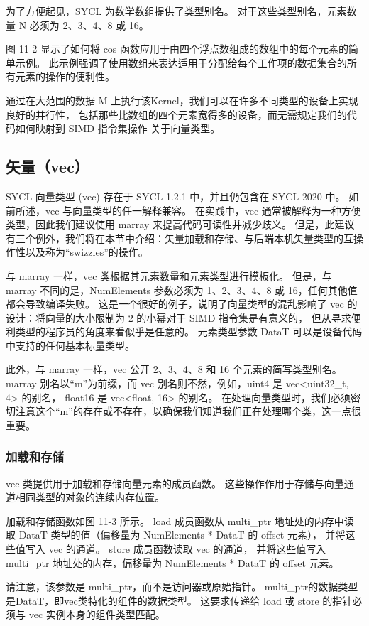 为了方便起见，SYCL 为数学数组提供了类型别名。 
对于这些类型别名，元素数量 N 必须为 2、3、4、8 或 16。

图 11-2 显示了如何将 cos 函数应用于由四个浮点数组成的数组中的每个元素的简单示例。 
此示例强调了使用数组来表达适用于分配给每个工作项的数据集合的所有元素的操作的便利性。

通过在大范围的数据 M 上执行该Kernel，我们可以在许多不同类型的设备上实现良好的并行性，
包括那些比数组的四个元素宽得多的设备，而无需规定我们的代码如何映射到 SIMD 指令集操作 关于向量类型。

\subsection{矢量（vec）}
SYCL 向量类型 (vec) 存在于 SYCL 1.2.1 中，并且仍包含在 SYCL 2020 中。
如前所述，vec 与向量类型的任一解释兼容。 
在实践中，vec 通常被解释为一种方便类型，因此我们建议使用 marray 来提高代码可读性并减少歧义。 
但是，此建议有三个例外，我们将在本节中介绍：矢量加载和存储、与后端本机矢量类型的互操作性以及称为“swizzles”的操作。

与 marray 一样，vec 类根据其元素数量和元素类型进行模板化。 
但是，与 marray 不同的是，NumElements 参数必须为 1、2、3、4、8 或 16，任何其他值都会导致编译失败。 
这是一个很好的例子，说明了向量类型的混乱影响了 vec 的设计：将向量的大小限制为 2 的小幂对于 SIMD 指令集是有意义的，
但从寻求便利类型的程序员的角度来看似乎是任意的。 元素类型参数 DataT 可以是设备代码中支持的任何基本标量类型。

此外，与 marray 一样，vec 公开 2、3、4、8 和 16 个元素的简写类型别名。 
marray 别名以“m”为前缀，而 vec 别名则不然，例如，uint4 是 vec<uint32\_t, 4> 的别名，
float16 是 vec<float, 16> 的别名。 
在处理向量类型时，我们必须密切注意这个“m”的存在或不存在，以确保我们知道我们正在处理哪个类，这一点很重要。

\subsubsection{加载和存储}
vec 类提供用于加载和存储向量元素的成员函数。 这些操作作用于存储与向量通道相同类型的对象的连续内存位置。

加载和存储函数如图 11-3 所示。 
load 成员函数从 multi\_ptr 地址处的内存中读取 DataT 类型的值（偏移量为 NumElements * DataT 的 offset 元素），
并将这些值写入 vec 的通道。 store 成员函数读取 vec 的通道，
并将这些值写入 multi\_ptr 地址处的内存，偏移量为 NumElements * DataT 的 offset 元素。

请注意，该参数是 multi\_ptr，而不是访问器或原始指针。 
multi\_ptr的数据类型是DataT，即vec类特化的组件的数据类型。 
这要求传递给 load 或 store 的指针必须与 vec 实例本身的组件类型匹配。

